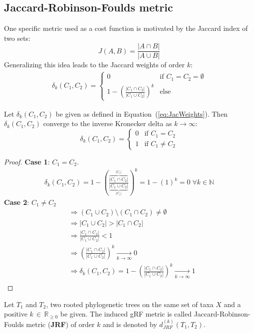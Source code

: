\subsection{Jaccard-Robinson-Foulds metric}
One specific metric used as a cost function is motivated by the Jaccard index of two sets: 
$$J(A,B) = \frac{|A \cap B|}{|A \cup B|}$$
Generalizing this idea leads to the Jaccard weights of order $k$:
\begin{align}\label{eq:JacWeights}
\delta_k(C_1,C_2) = 
\begin{cases}
0 & \text{if } C_1 = C_2 = \emptyset \\
1 - (\frac{|C_1 \cap C_2|}{|C_1 \cup C_2|})^k & \text{else}
\end{cases}
\end{align}
\begin{lem} \label{lem:kron}
Let $\delta_k(C_1,C_2)$ be given as defined in Equation~(\ref{eq:JacWeights}). Then $\delta_k(C_1,C_2)$ converge to the inverse Kronecker delta as $k \to \infty$:
$$\delta_k(C_1,C_2) =
\begin{cases}
0 & \text{if } C_1 = C_2 \\
1 & \text{if } C_1 \neq C_2
\end{cases}$$
\end{lem}
\begin{proof}
\textbf{Case 1}: $C_1 = C_2$.\\
\begin{align*}
\delta_k(C_1,C_2) = 1 - (\frac{\overbrace{|C_1 \cap C_2|}^{|C_1|}}{\underbrace{|C_1 \cup C_2|}_{|C_1|}})^k = 1 - (1)^k = 0 \; \forall k \in \mathbb{N}
\end{align*}
\textbf{Case 2}: $C_1 \neq C_2$
\begin{align*}
&\Rightarrow (C_1 \cup C_2) \setminus (C_1 \cap C_2) \neq \emptyset \\
&\Rightarrow |C_1 \cup C_2| > |C_1 \cap C_2| \\
&\Rightarrow \frac{|C_1 \cap C_2|}{|C_1 \cup C_2|} < 1 \\
&\Rightarrow (\frac{|C_1 \cap C_2|}{|C_1 \cup C_2|})^k \underset{k \to \infty}{\to} 0 \\
&\Rightarrow \delta_k(C_1,C_2) = 1 - (\frac{|C_1 \cap C_2|}{|C_1 \cup C_2|})^k \underset{k \to \infty}{\to} 1 \\
\end{align*}
\end{proof}
\begin{defin}
Let $T_1$ and $T_2$, two rooted phylogenetic trees on the same set of taxa $X$ and a positive $k \, \in \, \mathbb{R}_{\geq 0}$ be given. The induced gRF metric is called Jaccard-Robinson-Foulds metric (\textbf{JRF}) of order $k$ and is denoted by $d_{JRF}^{(k)}(T_1,T_2)$.\\
\end{defin}

